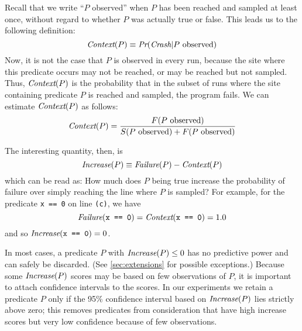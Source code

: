 Recall that we write ``$P$ observed'' when $P$ has been reached
and sampled at least once, without regard to whether $P$ was actually
true or false.
This leads us to the following definition:
\[
\textit{Context}(P) \equiv \textit{Pr}(\textit{Crash} | \text{$P$ observed})
\]
Now, it is not the case that $P$ is observed in every run, because the
site where this predicate occurs may not be reached, or may be reached
but not sampled.
Thus, $\textit{Context}(P)$ is the probability that
in the subset of runs where the site containing predicate $P$ is reached and sampled, the program fails.
We can estimate $\textit{Context}(P)$ as follows:
\[ \textit{Context}(P) = \frac{F(\text{$P$ observed})}{S(\text{$P$ observed}) +
  F(\text{$P$ observed})} \]

The interesting quantity, then, is
\begin{equation*}
 \textit{Increase}(P) \equiv \textit{Failure}(P) - \textit{Context}(P) \label{eqn:1}
\end{equation*}
which can be read as: How much does $P$ being true increase the probability of failure
over simply reaching the line where $P$ is sampled?  For example, for the predicate \texttt{x == 0} on line \texttt{(c)},
we have
\[\textit{Failure}(\texttt{x == 0}) = \textit{Context}(\texttt{x == 0}) = 1.0 \]
and so $\textit{Increase}(\texttt{x == 0}) = 0$.

In most cases, a predicate $P$ with $\textit{Increase}(P) \leq 0$ has no predictive
power and can safely be discarded.
(See \autoref{sec:extensions} for possible exceptions.)
Because some $\textit{Increase}(P)$ scores may be based on few observations of $P$,
it is important to attach confidence intervals to the scores.  
In our experiments we retain a predicate $P$ only if 
the 95\% confidence interval based on  $\textit{Increase}(P)$ lies
strictly above zero; this removes predicates from consideration 
that have high increase scores but very low confidence because of 
few observations.

